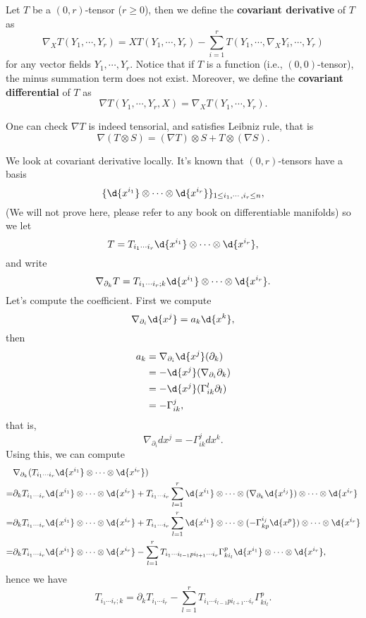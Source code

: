 \begin{defn}
    Let $T$ be a $(0,r)$-tensor ($r\geq 0$), then we define the \textbf{covariant derivative} of $T$ as
    \[\nabla_XT(Y_1,\cdots,Y_r)=XT(Y_1,\cdots,Y_r)-\sum_{i=1}^rT(Y_1,\cdots,\nabla_XY_i,\cdots,Y_r)\]
    for any vector fields $Y_1,\cdots,Y_r$.
    Notice that if $T$ is a function (i.e., $(0,0)$-tensor), the minus summation term does not exist.
    Moreover, we define the \textbf{covariant differential} of $T$ as
    \[\nabla T(Y_1,\cdots,Y_r,X)=\nabla_XT(Y_1,\cdots,Y_r).\]
\end{defn}

One can check $\nabla T$ is indeed tensorial, and satisfies Leibniz rule, that is
\[\nabla(T\otimes S)=(\nabla T)\otimes S+T\otimes(\nabla S).\]

We look at covariant derivative locally.
It's known that $(0,r)$-tensors have a basis
\[\{\d{x^{i_1}}\otimes\cdots\otimes\d{x^{i_r}}\}_{1\leq i_1,\cdots,i_r\leq n},\]
(We will not prove here, please refer to any book on differentiable manifolds)
so we let
\[T=T_{i_1\cdots i_r}\d{x^{i_1}}\otimes\cdots\otimes\d{x^{i_r}},\]
and write
\[\nabla_{\partial_k}T=T_{i_1\cdots i_r;k}\d{x^{i_1}}\otimes\cdots\otimes\d{x^{i_r}}.\]
Let's compute the coefficient. First we compute
\[\nabla_{\partial_i}\d{x^j}=a_k\d{x^k},\]
then
\begin{align*}
    a_k&=\nabla_{\partial_i}\d{x^j}(\partial_k)\\
    &=-\d{x^j}(\nabla_{\partial_i}\partial_k)\\
    &=-\d{x^j}(\Gamma^l_{ik}\partial_l)\\
    &=-\Gamma^j_{ik},
\end{align*}
that is,
\[\nabla_{\partial_i}d{x^j}=-\Gamma^j_{ik}d{x^k}.\]
Using this, we can compute
\begin{align*}
    &\nabla_{\partial_k}(T_{i_1\cdots i_r}\d{x^{i_1}}\otimes\cdots\otimes\d{x^{i_r}})\\
    =&\partial_kT_{i_1\cdots i_r}\d{x^{i_1}}\otimes\cdots\otimes\d{x^{i_r}}+T_{i_1\cdots i_r}\sum_{l=1}^r\d{x^{i_1}}\otimes\cdots\otimes(\nabla_{\partial_k}\d{x^{i_j}})\otimes\cdots\otimes\d{x^{i_r}}\\
    =&\partial_kT_{i_1\cdots i_r}\d{x^{i_1}}\otimes\cdots\otimes\d{x^{i_r}}+T_{i_1\cdots i_r}\sum_{l=1}^r\d{x^{i_1}}\otimes\cdots\otimes(-\Gamma^{i_j}_{kp}\d{x^p})\otimes\cdots\otimes\d{x^{i_r}}\\
    =&\partial_kT_{i_1\cdots i_r}\d{x^{i_1}}\otimes\cdots\otimes\d{x^{i_r}}-\sum_{l=1}^rT_{i_1\cdots i_{l-1}pi_{l+1}\cdots i_r}\Gamma^p_{ki_l}\d{x^{i_1}}\otimes\cdots\otimes\d{x^{i_r}},
\end{align*}
hence we have
\[T_{i_1\cdots i_r;k}=\partial_kT_{i_1\cdots i_r}-\sum_{l=1}^rT_{i_1\cdots i_{l-1}pi_{l+1}\cdots i_r}\Gamma^p_{ki_l}.\]

